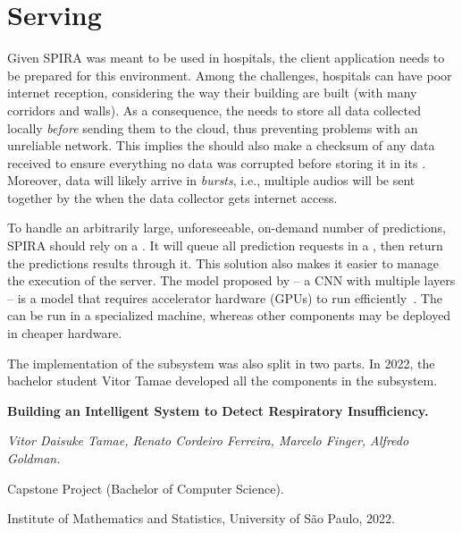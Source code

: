   \section{Serving}\label{sec:spira_serving}
  
  Given SPIRA was meant to be used in hospitals, the client application
  needs to be prepared for this environment. Among the challenges,
  hospitals can have poor internet reception, considering the way
  their building are built (with many corridors and walls).
  As a consequence, the  needs to store
  all data collected locally \emph{before} sending them to the cloud,
  thus preventing problems with an unreliable network. This implies
  the  should also make a checksum of
  any data received to ensure everything no data was corrupted before
  storing it in its .
  Moreover, data will likely arrive in \emph{bursts}, i.e., multiple
  audios will be sent together by the 
  when the data collector gets internet access.
  
  To handle an arbitrarily large, unforeseeable, on-demand number
  of predictions, SPIRA should rely on a . It will queue all prediction requests in a
  , then return the predictions
  results through it. This solution also makes it easier to manage
  the execution of the server.
  The model proposed by \citeauthor{Casanova2021DeepSpeech} -- a CNN with
  multiple layers -- is a model that requires accelerator hardware (GPUs)
  to run efficiently~\parencite{IanGoodfellow2016DeepLearning}.
  The  can be run
  in a specialized machine, whereas other components may be
  deployed in cheaper hardware.
  
  The implementation of the  subsystem was also
  split in two parts. In 2022, the bachelor student Vitor Tamae developed
  all the components in the subsystem.
  \begin{supervision}
    \label{sup:tcc_tamae}
    \noindent\textbf{%
      Building an Intelligent System to Detect Respiratory Insufficiency.
    }
  
    \noindent%
    \emph{%
      Vitor Daisuke Tamae,
      Renato Cordeiro Ferreira,
      Marcelo Finger,
      Alfredo Goldman.
    }
  
    \noindent%
    Capstone Project (Bachelor of Computer Science).
  
    \noindent%
    Institute of Mathematics and Statistics, University of São Paulo, 2022.
  \end{supervision}
  
